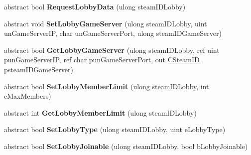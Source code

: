\begin{DoxyCompactItemize}
\item 
\mbox{\label{class_valve_1_1_steamworks_1_1_i_steam_matchmaking_aa288e2ee744dcecb1571f7a1ca30151e}} 
abstract bool {\bfseries Request\+Lobby\+Data} (ulong steam\+I\+D\+Lobby)
\item 
\mbox{\label{class_valve_1_1_steamworks_1_1_i_steam_matchmaking_a1df874959a5adf99a569c4928830de87}} 
abstract void {\bfseries Set\+Lobby\+Game\+Server} (ulong steam\+I\+D\+Lobby, uint un\+Game\+Server\+IP, char un\+Game\+Server\+Port, ulong steam\+I\+D\+Game\+Server)
\item 
\mbox{\label{class_valve_1_1_steamworks_1_1_i_steam_matchmaking_a8884bd6aed07bd995f11837b9f6f63dd}} 
abstract bool {\bfseries Get\+Lobby\+Game\+Server} (ulong steam\+I\+D\+Lobby, ref uint pun\+Game\+Server\+IP, ref char pun\+Game\+Server\+Port, out \hyperlink{struct_valve_1_1_steamworks_1_1_c_steam_i_d}{C\+Steam\+ID} psteam\+I\+D\+Game\+Server)
\item 
\mbox{\label{class_valve_1_1_steamworks_1_1_i_steam_matchmaking_a0256112144a894e1fb29af8934ae7090}} 
abstract bool {\bfseries Set\+Lobby\+Member\+Limit} (ulong steam\+I\+D\+Lobby, int c\+Max\+Members)
\item 
\mbox{\label{class_valve_1_1_steamworks_1_1_i_steam_matchmaking_a49689e5ad1af7d6e264982d9c3dcb174}} 
abstract int {\bfseries Get\+Lobby\+Member\+Limit} (ulong steam\+I\+D\+Lobby)
\item 
\mbox{\label{class_valve_1_1_steamworks_1_1_i_steam_matchmaking_ae58e3667786495a325785ffc48dbe408}} 
abstract bool {\bfseries Set\+Lobby\+Type} (ulong steam\+I\+D\+Lobby, uint e\+Lobby\+Type)
\item 
\mbox{\label{class_valve_1_1_steamworks_1_1_i_steam_matchmaking_acb3142f585be8ffe25fe264896e61864}} 
abstract bool {\bfseries Set\+Lobby\+Joinable} (ulong steam\+I\+D\+Lobby, bool b\+Lobby\+Joinable)
\item 

\end{DoxyCompactItemize}
